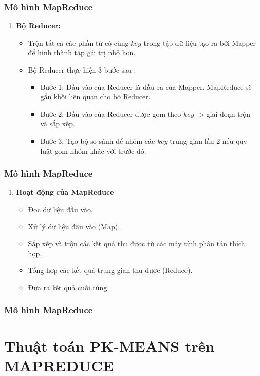 \documentclass[12pt]{beamer}
\begin{document}
	\begin{frame}
		\frametitle{Mô hình MapReduce}
		\begin{enumerate} [\textbf{3.}]
			\item \textbf{Bộ Reducer:}
			\begin{itemize}
				\item Trộn tất cả các phần tử có cùng $key$ trong tập dữ liệu tạo ra bởi Mapper để hình thành tập gái trị nhỏ hơn.
				\item Bộ Reducer thực hiện 3 bước sau :
				\begin{itemize}
					\item Bước 1: Đầu vào của Reducer là đầu ra của Mapper. MapReduce sẽ gắn khối liên quan cho bộ Reducer.
					\item Bước 2: Đầu vào của Reducer được gom theo $key$ -> giai đoạn trộn và sắp xếp.
					\item Bước 3: Tạo bộ so sánh để nhóm các $key$ trung gian lần 2 nếu quy luật gom nhóm khác với trước đó.
				\end{itemize}
			\end{itemize}
		\end{enumerate}
	\end{frame}

	\begin{frame}
		\frametitle{Mô hình MapReduce}
		\begin{enumerate} [\textbf{4.}]
			\item \textbf{Hoạt động của MapReduce}
				\begin{itemize}
					\item Đọc dữ liệu đầu vào.
					\item Xử lý dữ liệu đầu vào (Map).
					\item Sắp xếp và trộn các kết quả thu được từ các máy tính phân tán thích hợp.
					\item Tổng hợp các kết quả trung gian thu được (Reduce).
					\item Đưa ra kết quả cuối cùng.
				\end{itemize}
		\end{enumerate}
	\end{frame}
	
	\begin{frame}
		\frametitle{Mô hình MapReduce}
	\end{frame}
	
	\section{Thuật toán PK-MEANS trên MAPREDUCE}
\end{document}
